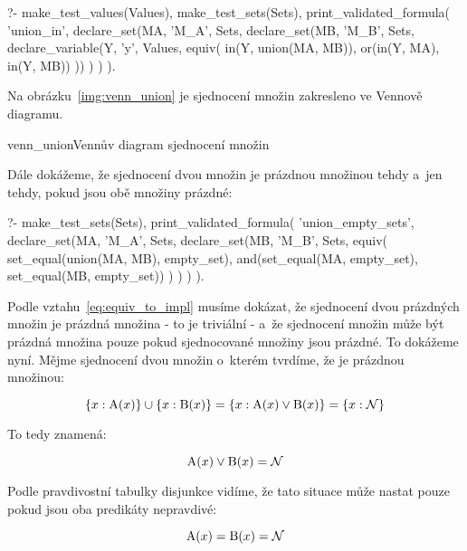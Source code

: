 \begin{prolog}
?- 	make_test_values(Values),
	make_test_sets(Sets),
	print_validated_formula(
		'union_in',
		declare_set(MA, 'M_A', Sets,
			declare_set(MB, 'M_B', Sets,
				declare_variable(Y, 'y', Values, equiv(
					in(Y, union(MA, MB)),
					or(in(Y, MA), in(Y, MB))
				))
			)
		)
	).
\end{prolog}

Na obrázku~\ref{img:venn_union} je sjednocení množin zakresleno ve Vennově diagramu.

\begin{fig}{venn_union}{Vennův diagram sjednocení množin}
\end{fig}

Dále dokážeme, že sjednocení dvou množin je prázdnou množinou tehdy a~jen tehdy, pokud jsou obě množiny prázdné:
\begin{prolog}
?-	make_test_sets(Sets),
	print_validated_formula(
		'union_empty_sets',
		declare_set(MA, 'M_A', Sets,
			declare_set(MB, 'M_B', Sets,
				equiv(
					set_equal(union(MA, MB), empty_set),
					and(set_equal(MA, empty_set), set_equal(MB, empty_set))
				)
			)
		)
	).
\end{prolog}

Podle vztahu~\eqref{eq:equiv_to_impl} musíme dokázat, že sjednocení dvou prázdných množin je prázdná množina - to je triviální - a~že sjednocení množin může být prázdná množina pouze pokud sjednocované množiny jsou prázdné. To dokážeme nyní. Mějme sjednocení dvou množin o~kterém tvrdíme, že je prázdnou množinou:

\begin{equation}
\{x: \mathrm{A}(x)\} \cup \{x: \mathrm{B}(x)\} = \{x: \mathrm{A}(x) \lor \mathrm{B}(x)\} = \{x: \mathcal{N}\}
\end{equation}

To tedy znamená:

\begin{equation}
\mathrm{A}(x) \lor \mathrm{B}(x) = \mathcal{N}
\end{equation}

Podle pravdivostní tabulky disjunkce vidíme, že tato situace může nastat pouze pokud jsou oba predikáty nepravdivé:

\begin{equation}
\mathrm{A}(x) = \mathrm{B}(x) = \mathcal{N}
\end{equation}

